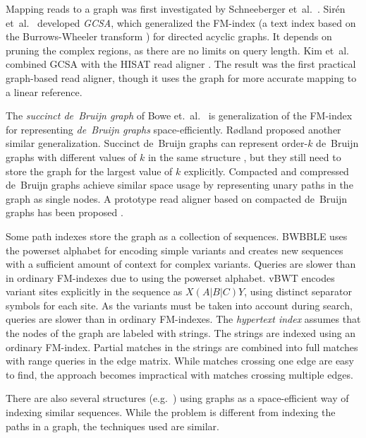 \documentclass[a4paper,UKenglish]{lipics-v2016}
\newcommand{\orderk}[1]{order\nobreakdash-$#1$}
\begin{document}
Mapping reads to a graph was first investigated by Schneeberger et~al.~\cite{Schneeberger2009}. Sirén et~al.~\cite{Siren2014} developed \emph{GCSA}, which generalized the FM\nobreakdash-index \cite{Ferragina2005a} (a text index based on the Burrows-Wheeler transform \cite{Burrows1994}) for directed acyclic graphs. It depends on pruning the complex regions, as there are no limits on query length. Kim et~al.~\cite{Kim2015-2016} combined GCSA with the HISAT read aligner \cite{Kim2015}. The result was the first practical graph-based read aligner, though it uses the graph for more accurate mapping to a linear reference.

The \emph{succinct de~Bruijn graph} of Bowe et.~al.~\cite{Bowe2012} is generalization of the FM\nobreakdash-index for representing \emph{de~Bruijn graphs} space-efficiently. Rødland \cite{Roedland2013} proposed another similar generalization. Succinct de~Bruijn graphs can represent \orderk{k} de~Bruijn graphs with different values of $k$ in the same structure \cite{Boucher2014}, but they still need to store the graph for the largest value of $k$ explicitly. Compacted \cite{Cazaux2014} and compressed de~Bruijn graphs \cite{Marcus2014} achieve similar space usage by representing unary paths in the graph as single nodes. A prototype read aligner based on compacted de~Bruijn graphs has been proposed \cite{Limasset2015}.

Some path indexes store the graph as a collection of sequences. BWBBLE \cite{Huang2013} uses the powerset alphabet for encoding simple variants and creates new sequences with a sufficient amount of context for complex variants. Queries are slower than in ordinary FM\nobreakdash-indexes due to using the powerset alphabet. vBWT \cite{Maciuca2016} encodes variant sites explicitly in the sequence as  $X(A|B|C)Y$, using distinct separator symbols for each site. As the variants must be taken into account during search, queries are slower than in ordinary FM\nobreakdash-indexes. The \emph{hypertext index} \cite{Thachuk2013} assumes that the nodes of the graph are labeled with strings. The strings are indexed using an ordinary FM-index. Partial matches in the strings are combined into full matches with range queries in the edge matrix. While matches crossing one edge are easy to find, the approach becomes impractical with matches crossing multiple edges.

There are also several structures (e.g.~\cite{Huang2010,Wandelt2013,Danek2014,Na2015,Na2016}) using graphs as a space-efficient way of indexing similar sequences. While the problem is different from indexing the paths in a graph, the techniques used are similar.
\end{document}
